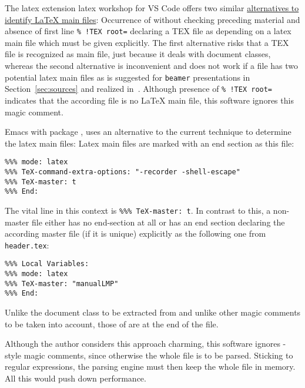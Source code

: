 


The latex extension latex workshop for VS Code offers two similar 
\href{https://github.com/James-Yu/LaTeX-Workshop/wiki/Compile#multi-file-projects}%
{alternatives to identify \LaTeX{} main files}: 
Occurrence of  without checking preceding material and 
absence of first line \texttt{\%~!TEX root=} declaring a TEX file as depending on a latex main file 
which must be given explicitly. 
The first alternative risks that a TEX file is recognized as main file, 
just because it deals with document classes, 
whereas the second alternative is inconvenient 
and does not work if a file has two potential latex main files 
as is suggested for \texttt{beamer} presentations in Section~\ref{sec:sources} 
and realized in~\cite{PresBeamer}. 
Although presence of \texttt{\%~!TEX root=} indicates that the according file 
is no \LaTeX{} main file, this software ignores this magic comment. 

Emacs with package \auctex, uses an alternative
to the current technique to determine the latex main files: 
Latex main files are marked with an end section as this file: 
%
\begin{Verbatim}[fontsize=\footnotesize]
%%% Local Variables: 
%%% mode: latex
%%% TeX-command-extra-options: "-recorder -shell-escape" 
%%% TeX-master: t
%%% End: 
\end{Verbatim}
% 
The vital line in this context is \texttt{\%\%\% TeX-master: t}. 
In contrast to this, a non-master file 
either has no end-section at all or has an end section 
declaring the according master file (if it is unique) 
explicitly as the following one from \texttt{header.tex}: 
%
\begin{verbatim}
%%% Local Variables:
%%% mode: latex
%%% TeX-master: "manualLMP"
%%% End:
\end{verbatim}

Unlike the document class to be extracted from  
and unlike other magic comments to be taken into account, 
those of \auctex{} are at the end of the file. 

Although the author considers this approach charming, 
this software ignores \auctex-style magic comments, 
since otherwise the whole file is to be parsed. 
Sticking to regular expressions, 
the parsing engine must then keep the whole file in memory. 
All this would push down performance. 



